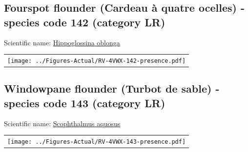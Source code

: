 \documentclass[12pt]{article}\usepackage[]{graphicx}\usepackage[]{color}
\begin{document}
\renewcommand\thefigure{\thesubsection\Alph{figure}}

\setcounter{figure}{0}

\hypertarget{sec:142}{%
\subsection{Fourspot flounder (Cardeau à quatre ocelles) - species code 142 (category LR)}\label{sec:142}}

  


Scientific name: \href{http://www.marinespecies.org/aphia.php?p=taxdetails\&id=158833}{Hippoglossina oblonga} \newline
\begin{minipage}{1.0\textwidth}
 \begin{tabular}{c}
\texttt{[image: ../Figures-Actual/RV-4VWX-142-presence.pdf]} \\ 
\end{tabular} 
\end{minipage}
\clearpage

\renewcommand\thefigure{\thesubsection\Alph{figure}}

\setcounter{figure}{0}

\hypertarget{sec:143}{%
\subsection{Windowpane flounder (Turbot de sable) - species code 143 (category LR)}\label{sec:143}}

  


Scientific name: \href{http://www.marinespecies.org/aphia.php?p=taxdetails\&id=158907}{Scophthalmus aquosus} \newline
\begin{minipage}{1.0\textwidth}
 \begin{tabular}{c}
\texttt{[image: ../Figures-Actual/RV-4VWX-143-presence.pdf]} \\ 
\end{tabular} 
\end{minipage}
\clearpage
\end{document}

